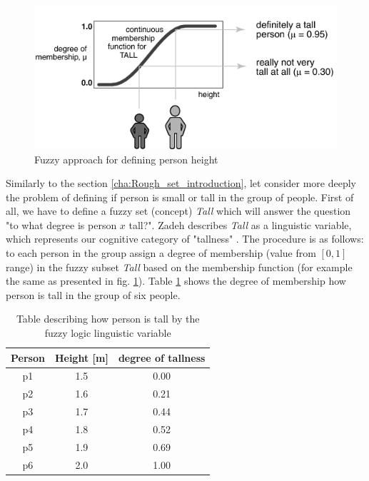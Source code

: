 \begin{itemize}
\begin{figure}[H]
\begin{center}
                \includegraphics{fig/fuzzy_tall.png}
            \end{center}
            \caption{Fuzzy approach for defining person height\footnotemark}
            \label{fig:fuzzy_tall}
        \end{figure}
\end{itemize}

Similarly to the section \ref{cha:Rough_set_introduction}, let consider more deeply the problem of defining 
if person is small or tall in the group of people. First of all, we have to define a fuzzy
set (concept) \textit{Tall} which will answer the question 
"to what degree is person $x$ tall?". Zadeh describes \textit{Tall} as a
linguistic variable, which represents our cognitive category of "tallness"
\cite{bib25}. The procedure is as follows: to each person in the group 
assign a degree of membership (value from $[0, 1]$ range) in the fuzzy subset \textit{Tall}
based on the membership function (for example the same as presented in fig.
\ref{fig:fuzzy_tall}). Table \ref{tab:fuzzy_logic_example} shows the degree of
membership how person is tall in the group of six people.
\begin{table}[H]
    \centering
    \caption{Table describing how person is tall by the fuzzy logic linguistic
    variable}
    \begin{tabular}{|c|c|c|}
        \hline
        Person & Height [m] & degree of tallness \\ \hline \hline
        p1 & 1.5 & 0.00 \\ \hline
        p2 & 1.6 & 0.21 \\ \hline
        p3 & 1.7 & 0.44 \\ \hline
        p4 & 1.8 & 0.52 \\ \hline
        p5 & 1.9 & 0.69 \\ \hline
        p6 & 2.0 & 1.00 \\ \hline
    \end{tabular}
    \label{tab:fuzzy_logic_example}
\end{table}

